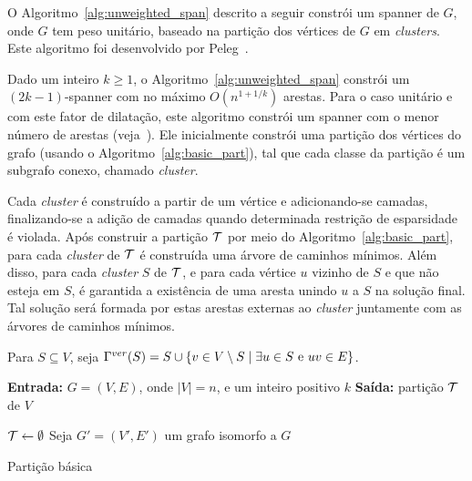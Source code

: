 O Algoritmo~\ref{alg:unweighted_span} descrito a seguir constrói um
spanner de $G$, onde $G$ tem peso unitário,
baseado na partição dos vértices de $G$ em
\emph{clusters}.  Este algoritmo foi desenvolvido por
Peleg~\cite{Peleg2000}.

Dado um inteiro $k \ge 1$, o Algoritmo~\ref{alg:unweighted_span}
constrói um $(2k - 1)$-spanner com no máximo $O(n^{1 + 1/k})$ arestas.
Para o caso unitário e com este fator de dilatação, este algoritmo
constrói um spanner com o menor número de arestas
(veja~\cite{BaswanaKMP2010}).  Ele inicialmente constrói uma partição
dos vértices do grafo (usando o Algoritmo~\ref{alg:basic_part}),
tal que cada classe da partição é um subgrafo conexo, chamado \emph{cluster}.

Cada \emph{cluster} é construído a partir de um vértice e
adicionando-se camadas, finalizando-se a adição de camadas quando
determinada restrição de esparsidade é violada. Após construir a
partição $\mathcal{T}$ por meio do Algoritmo~\ref{alg:basic_part},
para cada \emph{cluster} de $\mathcal{T}$ é construída uma árvore de
caminhos mínimos. Além disso, para cada \emph{cluster} $S$ de
$\mathcal{T}$, e para cada vértice $u$ vizinho de $S$ e que não esteja
em $S$, é garantida a existência de uma aresta unindo $u$ a $S$ na
solução final. Tal solução será formada por estas arestas externas ao
\emph{cluster} juntamente com as árvores de caminhos
mínimos. 


Para $S \subseteq V$, seja $\Gamma^{ver}(S) = S \cup \{v \in V
\setminus S \;| \;\exists u \in S\text{ e }uv \in E\}$. 


\begin{algorithm}
  \SetAlgoLined
  \textbf{Entrada:} {$G=(V, E)$, onde $|V|=n$, e um inteiro positivo $k$}\;
  \textbf{Saída:} {partição $\mathcal{T}$ de $V$}\;
  
  $\mathcal{T} \gets \emptyset$\;
  Seja $G'=(V',E')$ um grafo isomorfo a $G$\;
  \caption{Partição básica} 
  \label{alg:basic_part}
\end{algorithm}

